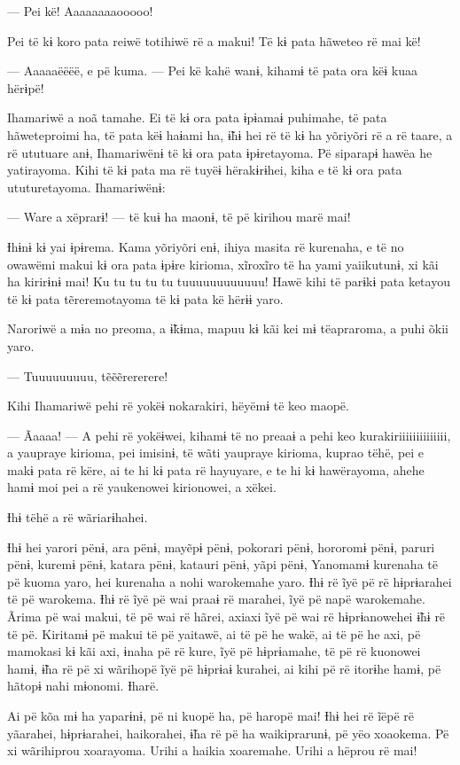 --- Pei kë! Aaaaaaaaooooo! 

Pei të kɨ koro pata reiwë totihiwë rë a makui! Të kɨ pata hãweteo rë mai
kë! 

--- Aaaaaëëëë, e pë kuma. --- Pei kë kahë wanɨ, kihamɨ të pata ora këɨ
kuaa hërɨpë! 

Ihamariwë a noã tamahe. Ei të kɨ ora pata ɨpɨamaɨ puhimahe, të pata
hãweteproimi ha, të pata këɨ haɨami ha, ɨ̃hɨ hei rë të kɨ ha yõriyõri rë
a rë taare, a rë ututuare anɨ, Ihamariwënɨ të kɨ ora pata ɨpɨretayoma.
Pë siparapɨ hawëa he yatirayoma. Kihi të kɨ pata ma rë tuyëɨ
hërakɨrɨhei, kiha e të kɨ ora pata ututuretayoma. Ihamariwënɨ: 

--- Ware a xëprarɨ! --- të kuɨ ha maonɨ, të pë kirihou marë mai!

Ɨhɨnɨ kɨ yai ɨpɨrema. Kama yõriyõri enɨ, ihiya masita rë kurenaha, e të
no owawëmi makui kɨ ora pata ɨpɨre kirioma, xĩroxĩro të ha yami
yaiikutunɨ, xi kãi ha kirirɨnɨ mai! Ku tu tu tu tu tuuuuuuuuuuuu! Hawë
kihi të parɨkɨ pata ketayou të kɨ pata tẽreremotayoma të kɨ pata kë
hërɨɨ yaro. 

Naroriwë a mɨa no preoma, a ɨ̃kɨma, mapuu kɨ kãi kei mɨ tëapraroma, a
puhi õkii yaro. 

--- Tuuuuuuuuu, tẽẽẽrererere! 

Kihi Ihamariwë pehi rë yokëɨ nokarakiri, hëyëmɨ të keo maopë. 

--- Ãaaaa! --- A pehi rë yokëɨwei, kihamɨ të no preaaɨ a pehi keo
kurakiriiiiiiiiiiiiii, a yaupraye kirioma, pei imisinɨ, të wãti yaupraye
kirioma, kuprao tëhë, pei e makɨ pata rë këre, ai te hi kɨ pata rë
hayuyare, e te hi kɨ hawërayoma, ahehe hamɨ moi pei a rë yaukenowei
kirionowei, a xëkei. 

Ɨhɨ tëhë a rë wãriarɨhahei. 

Ɨhɨ hei yarori pënɨ, ara pënɨ, mayẽpɨ pënɨ, pokorari pënɨ, hororomɨ
pënɨ, paruri pënɨ, kuremɨ pënɨ, katara pënɨ, katauri pënɨ, yãpi pënɨ,
Yanomamɨ kurenaha të pë kuoma yaro, hei kurenaha a nohi warokemahe yaro.
Ɨhɨ rë ĩyë pë rë hɨprɨarahei të pë warokema. Ɨhɨ rë ĩyë pë wai praaɨ rë
marahei, ĩyë pë napë warokemahe. Ãrima pë wai makui, të pë wai rë hãrei,
axiaxi ĩyë pë wai rë hɨprɨanowehei ɨ̃hɨ rë të pë. Kiritamɨ pë makui të pë
yaitawë, ai të pë he wakë, ai të pë he axi, pë mamokasi kɨ kãi axi,
ɨnaha pë rë kure, ĩyë pë hɨprɨamahe, të pë rë kuonowei hamɨ, ɨ̃ha rë pë
xi wãrihopë ĩyë pë hɨprɨaɨ kurahei, ai kihi pë rë itorɨhe hamɨ, pë
hãtopɨ nahi mɨonomi. Ɨharë. 

Ai pë kõa mɨ ha yaparɨnɨ, pë ni kuopë ha, pë haropë mai! Ɨhɨ hei rë ĩëpë
rë yãarahei, hɨprɨarahei, haikorahei, ɨ̃ha rë pë ha waikiprarunɨ, pë yëo
xoaokema. Pë xi wãrihiprou xoarayoma. Urihi a haikia xoaremahe. Urihi a
hëprou rë mai! 

